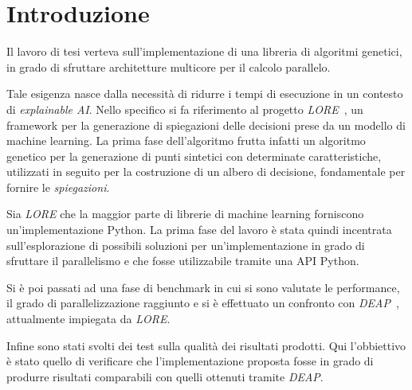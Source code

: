 \chapter*{Introduzione}

Il lavoro di tesi verteva sull'implementazione di una libreria di algoritmi
genetici, in grado di sfruttare architetture multicore per il calcolo parallelo.

Tale esigenza nasce dalla necessità di ridurre i tempi di esecuzione in un
contesto di \textit{explainable AI}. Nello specifico si fa riferimento al
progetto \textit{LORE}~\cite{guidotti2018lore}, un framework per la generazione
di spiegazioni delle decisioni prese da un modello di machine learning. La prima
fase dell'algoritmo frutta infatti un algoritmo genetico per la generazione di
punti sintetici con determinate caratteristiche, utilizzati in seguito per la
costruzione di un albero di decisione, fondamentale per fornire le
\textit{spiegazioni}.

Sia \textit{LORE} che la maggior parte di librerie di machine learning
forniscono un'implementazione Python. La prima fase del lavoro è stata quindi
incentrata sull'esplorazione di possibili soluzioni per un'implementazione in
grado di sfruttare il parallelismo e che fosse utilizzabile tramite una API
Python.

Si è poi passati ad una fase di benchmark in cui si sono valutate le
performance, il grado di parallelizzazione raggiunto e si è effettuato un
confronto con \textit{DEAP}~\cite{DEAP_JMLR2012}, attualmente impiegata da
\textit{LORE}.

Infine sono stati svolti dei test sulla qualità dei risultati prodotti. Qui
l'obbiettivo è stato quello di verificare che l'implementazione proposta fosse
in grado di produrre risultati comparabili con quelli ottenuti tramite
\textit{DEAP}.